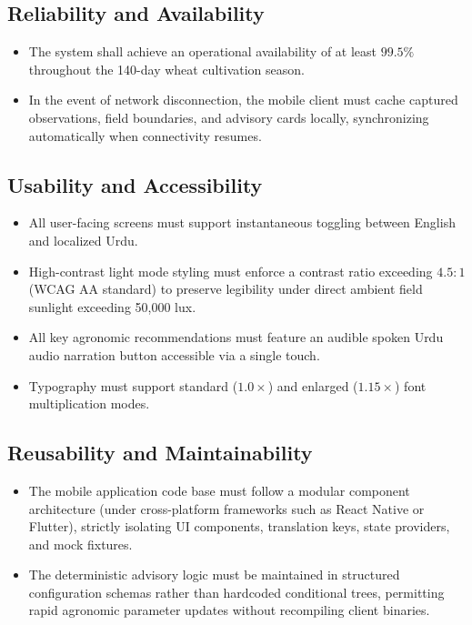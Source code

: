\documentclass{FastFyp}
\begin{document}
\subsection{Reliability and Availability}
\begin{itemize}
    \item The system shall achieve an operational availability of at least $99.5\%$ throughout the 140-day wheat cultivation season.
    \item In the event of network disconnection, the mobile client must cache captured observations, field boundaries, and advisory cards locally, synchronizing automatically when connectivity resumes.
\end{itemize}

\subsection{Usability and Accessibility}
\begin{itemize}
    \item All user-facing screens must support instantaneous toggling between English and localized Urdu.
    \item High-contrast light mode styling must enforce a contrast ratio exceeding $4.5:1$ (WCAG AA standard) to preserve legibility under direct ambient field sunlight exceeding 50,000 lux.
    \item All key agronomic recommendations must feature an audible spoken Urdu audio narration button accessible via a single touch.
    \item Typography must support standard ($1.0\times$) and enlarged ($1.15\times$) font multiplication modes.
\end{itemize}

\subsection{Reusability and Maintainability}
\begin{itemize}
    \item The mobile application code base must follow a modular component architecture (under cross-platform frameworks such as React Native or Flutter), strictly isolating UI components, translation keys, state providers, and mock fixtures.
    \item The deterministic advisory logic must be maintained in structured configuration schemas rather than hardcoded conditional trees, permitting rapid agronomic parameter updates without recompiling client binaries.
\end{itemize}
\end{document}
